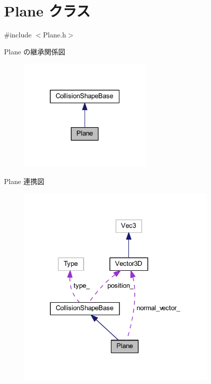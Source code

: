 \hypertarget{class_plane}{}\section{Plane クラス}
\label{class_plane}


{\ttfamily \#include $<$Plane.\+h$>$}



Plane の継承関係図\nopagebreak
\begin{figure}[H]
\begin{center}
\leavevmode
\includegraphics[width=184pt]{class_plane__inherit__graph}
\end{center}
\end{figure}


Plane 連携図\nopagebreak
\begin{figure}[H]
\begin{center}
\leavevmode
\includegraphics[width=276pt]{class_plane__coll__graph}
\end{center}
\end{figure}
